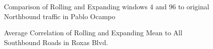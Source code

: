 \begin{figure}[t] 
\centering
    \centering
      \captionsetup{justification=centering}
    \hfill
    \caption{Comparison of Rolling and Expanding windows 4 and 96 to original Northbound traffic in Pablo Ocampo}
\end{figure}

\begin{figure}[t] 
\centering
  \centering
  \caption{Average Correlation of Rolling and Expanding Mean to All Southbound Roads in Roxas Blvd.}
  \label{heatmap_roxas}
\end{figure}


